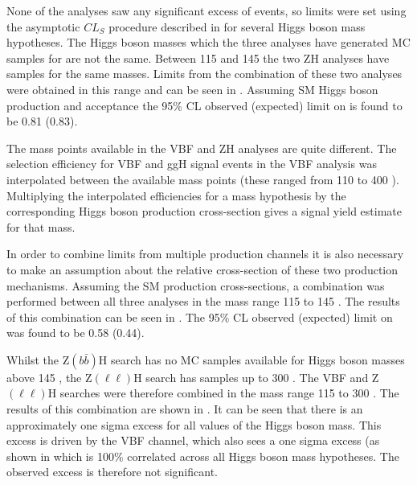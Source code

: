 None of the analyses saw any significant excess of events, so limits were set using the asymptotic $CL_{S}$ procedure described in  for several Higgs boson mass hypotheses. The Higgs boson masses which the three analyses have generated \ac{MC} samples for are not the same. Between 115 and 145 \GeV the two ZH analyses have samples for the same masses. Limits from the combination of these two analyses were obtained in this range and can be seen in . Assuming \ac{SM} Higgs boson production and acceptance the 95\% \ac{CL} observed (expected) limit on \BRinv is found to be 0.81 (0.83).

The mass points available in the \ac{VBF} and ZH analyses are quite different. The selection efficiency for \ac{VBF} and \ac{ggH} signal events in the \ac{VBF} analysis was interpolated between the available mass points (these ranged from 110 to 400 \GeV). Multiplying the interpolated efficiencies for a mass hypothesis by the corresponding Higgs boson production cross-section gives a signal yield estimate for that mass. 

In order to combine limits from multiple production channels it is also necessary to make an assumption about the relative cross-section of these two production mechanisms. Assuming the \ac{SM} production cross-sections, a combination was performed between all three analyses in the mass range 115 to 145 \GeV. The results of this combination can be seen in . The 95\% \ac{CL} observed (expected) limit on \BRinv was found to be 0.58 (0.44).

Whilst the Z$(b\bar{b})$H search has no \ac{MC} samples available for Higgs boson masses above 145 \GeV, the Z$(\ell\ell)$H search has samples up to 300 \GeV. The \ac{VBF} and Z$(\ell\ell)$H searches were therefore combined in the mass range 115 to 300 \GeV. The results of this combination are shown in . It can be seen that there is an approximately one sigma excess for all values of the Higgs boson mass. This excess is driven by the \ac{VBF} channel, which also sees a one sigma excess (as shown in  which is 100\% correlated across all Higgs boson mass hypotheses. The observed excess is therefore not significant.

